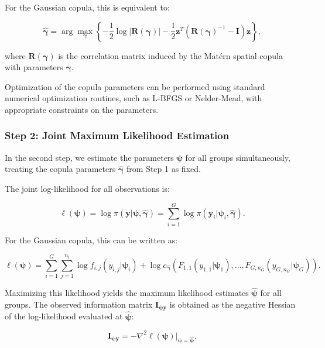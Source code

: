 For the Gaussian copula, this is equivalent to:

\begin{equation}
    \hat{\boldsymbol{\gamma}} = \arg\max_{\boldsymbol{\gamma}} \left\{-\frac{1}{2}\log|\mathbf{R}(\boldsymbol{\gamma})| - \frac{1}{2}\mathbf{z}^T(\mathbf{R}(\boldsymbol{\gamma})^{-1} - \mathbf{I})\mathbf{z}\right\},
\end{equation}

where $\mathbf{R}(\boldsymbol{\gamma})$ is the correlation matrix induced by the Matérn spatial copula with parameters $\boldsymbol{\gamma}$.

Optimization of the copula parameters can be performed using standard numerical optimization routines, such as L-BFGS or Nelder-Mead, with appropriate constraints on the parameters.

\subsubsection{Step 2: Joint Maximum Likelihood Estimation}
In the second step, we estimate the parameters $\boldsymbol{\psi}$ for all groups simultaneously, treating the copula parameters $\hat{\boldsymbol{\gamma}}$ from Step 1 as fixed.

The joint log-likelihood for all observations is:

\begin{equation}
    \ell(\boldsymbol{\psi}) = \log \pi(\mathbf{y}|\boldsymbol{\psi}, \hat{\boldsymbol{\gamma}}) = \sum_{i=1}^G \log \pi(\mathbf{y}_i|\boldsymbol{\psi}_i, \hat{\boldsymbol{\gamma}}).
\end{equation}

For the Gaussian copula, this can be written as:

\begin{equation}
    \ell(\boldsymbol{\psi}) = \sum_{i=1}^G \sum_{j=1}^{n_i} \log f_{i,j}(y_{i,j}|\boldsymbol{\psi}_i) + \log c_{\hat{\boldsymbol{\gamma}}}(F_{1,1}(y_{1,1}|\boldsymbol{\psi}_1), \ldots, F_{G,n_G}(y_{G,n_G}|\boldsymbol{\psi}_G)).
\end{equation}

Maximizing this likelihood yields the maximum likelihood estimates $\hat{\boldsymbol{\psi}}$ for all groups. The observed information matrix $\mathbf{I}_{\boldsymbol{\psi}\mathbf{y}}$ is obtained as the negative Hessian of the log-likelihood evaluated at $\hat{\boldsymbol{\psi}}$:

\begin{equation}
    \mathbf{I}_{\boldsymbol{\psi}\mathbf{y}} = -\nabla^2 \ell(\boldsymbol{\psi})|_{\boldsymbol{\psi}=\hat{\boldsymbol{\psi}}}.
\end{equation}

